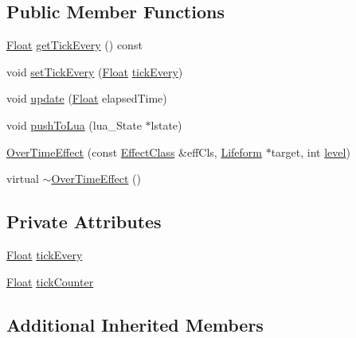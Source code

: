 \subsection*{Public Member Functions}
\begin{DoxyCompactItemize}
\item 
\hyperlink{namespaceZeta_a1e0a1265f9b3bd3075fb0fabd39088ba}{Float} \hyperlink{classZeta_1_1OverTimeEffect_a9dd808f24df1b231601517b18570a6c4}{get\+Tick\+Every} () const 
\item 
void \hyperlink{classZeta_1_1OverTimeEffect_a3cf5930ea13d07dd263d241031c86e3d}{set\+Tick\+Every} (\hyperlink{namespaceZeta_a1e0a1265f9b3bd3075fb0fabd39088ba}{Float} \hyperlink{classZeta_1_1OverTimeEffect_a7ce6ce07d39162a1d43a5f57d3acd980}{tick\+Every})
\item 
void \hyperlink{classZeta_1_1OverTimeEffect_aedb8e15db2f8320f951fed874cdb0c4c}{update} (\hyperlink{namespaceZeta_a1e0a1265f9b3bd3075fb0fabd39088ba}{Float} elapsed\+Time)
\item 
void \hyperlink{classZeta_1_1OverTimeEffect_aa8dbf53cae3c9a1b92591d209bc37320}{push\+To\+Lua} (lua\+\_\+\+State $\ast$lstate)
\item 
\hyperlink{classZeta_1_1OverTimeEffect_a74c77e506d1bb9ec6fb3534942f003ba}{Over\+Time\+Effect} (const \hyperlink{classZeta_1_1EffectClass}{Effect\+Class} \&eff\+Cls, \hyperlink{classZeta_1_1Lifeform}{Lifeform} $\ast$target, int \hyperlink{classZeta_1_1Effect_aec101c1a7eda022328a0b0ebb1b10c77}{level})
\item 
virtual \hyperlink{classZeta_1_1OverTimeEffect_aa09780908b99bb53ae67600dd49309d7}{$\sim$\+Over\+Time\+Effect} ()
\end{DoxyCompactItemize}
\subsection*{Private Attributes}
\begin{DoxyCompactItemize}
\item 
\hyperlink{namespaceZeta_a1e0a1265f9b3bd3075fb0fabd39088ba}{Float} \hyperlink{classZeta_1_1OverTimeEffect_a7ce6ce07d39162a1d43a5f57d3acd980}{tick\+Every}
\item 
\hyperlink{namespaceZeta_a1e0a1265f9b3bd3075fb0fabd39088ba}{Float} \hyperlink{classZeta_1_1OverTimeEffect_a90137be439da945f6b551ea974ac5890}{tick\+Counter}
\end{DoxyCompactItemize}
\subsection*{Additional Inherited Members}


